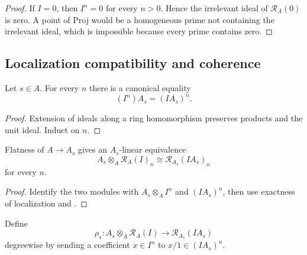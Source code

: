 \begin{proof}
  If $I=0$, then $I^n=0$ for every $n>0$.  Hence the irrelevant ideal of
  $\mathcal R_A(0)$ is zero.  A point of Proj would be a homogeneous prime not
  containing the irrelevant ideal, which is impossible because every prime
  contains zero.
\end{proof}

\subsection{Localization compatibility and coherence}

\begin{lemma}
  \label{lemma:nagata-localization-ideal-pow}

  Let $s\in A$.  For every $n$ there is a canonical equality
  \[
    (I^n)A_s=(IA_s)^n.
  \]
\end{lemma}

\begin{proof}
  Extension of ideals along a ring homomorphism preserves products and the
  unit ideal.  Induct on $n$.
\end{proof}

\begin{lemma}
  \label{lemma:nagata-localization-rees-piece}

  Flatness of $A\to A_s$ gives an $A_s$-linear equivalence
  \[
    A_s\otimes_A\mathcal R_A(I)_n
      \cong\mathcal R_{A_s}(IA_s)_n
  \]
  for every $n$.
\end{lemma}

\begin{proof}
  Identify the two modules with
  $A_s\otimes_AI^n$ and $(IA_s)^n$, then use exactness of localization and
  .
\end{proof}

\begin{definition}
  \label{def:nagata-rees-localization-map}

  Define
  \[
    \rho_s\colon A_s\otimes_A\mathcal R_A(I)
      \longrightarrow\mathcal R_{A_s}(IA_s)
  \]
  degreewise by sending a coefficient $x\in I^n$ to $x/1\in(IA_s)^n$.
\end{definition}

